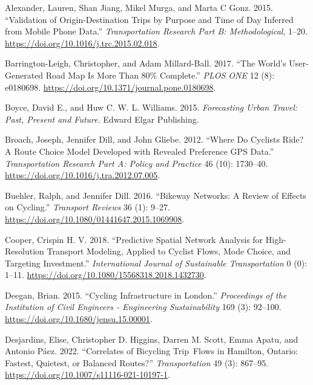 \documentclass{isprs} %
\newlength{\cslhangindent}
\newlength{\cslentryspacingunit} %
\newenvironment{CSLReferences}[2] %
 {%
  \setlength{\parindent}{0pt}
  \ifodd #1
  \let\oldpar\par
  \def\par{\hangindent=\cslhangindent\oldpar}
  \fi
  \setlength{\parskip}{#2\cslentryspacingunit}
 }%
 {}
\begin{document}
\hypertarget{refs}{}
\begin{CSLReferences}{1}{0}
\leavevmode{}%
Alexander, Lauren, Shan Jiang, Mikel Murga, and Marta C Gonz. 2015. {``Validation of Origin-Destination Trips by Purpose and Time of Day Inferred from Mobile Phone Data.''} \emph{Transportation Research Part B: Methodological}, 1--20. \url{https://doi.org/10.1016/j.trc.2015.02.018}.

\leavevmode{}%
Barrington-Leigh, Christopher, and Adam Millard-Ball. 2017. {``The World's User-Generated Road Map Is More Than 80\% Complete.''} \emph{PLOS ONE} 12 (8): e0180698. \url{https://doi.org/10.1371/journal.pone.0180698}.

\leavevmode{}%
Boyce, David E., and Huw C. W. L. Williams. 2015. \emph{Forecasting {Urban Travel}: {Past}, {Present} and {Future}}. {Edward Elgar Publishing}.

\leavevmode{}%
Broach, Joseph, Jennifer Dill, and John Gliebe. 2012. {``Where Do Cyclists Ride? {A} Route Choice Model Developed with Revealed Preference {GPS} Data.''} \emph{Transportation Research Part A: Policy and Practice} 46 (10): 1730--40. \url{https://doi.org/10.1016/j.tra.2012.07.005}.

\leavevmode{}%
Buehler, Ralph, and Jennifer Dill. 2016. {``Bikeway {Networks}: {A Review} of {Effects} on {Cycling}.''} \emph{Transport Reviews} 36 (1): 9--27. \url{https://doi.org/10.1080/01441647.2015.1069908}.

\leavevmode{}%
Cooper, Crispin H. V. 2018. {``Predictive Spatial Network Analysis for High-Resolution Transport Modeling, Applied to Cyclist Flows, Mode Choice, and Targeting Investment.''} \emph{International Journal of Sustainable Transportation} 0 (0): 1--11. \url{https://doi.org/10.1080/15568318.2018.1432730}.

\leavevmode{}%
Deegan, Brian. 2015. {``Cycling Infrastructure in {London}.''} \emph{Proceedings of the Institution of Civil Engineers - Engineering Sustainability} 169 (3): 92--100. \url{https://doi.org/10.1680/jensu.15.00001}.

\leavevmode{}%
Desjardins, Elise, Christopher D. Higgins, Darren M. Scott, Emma Apatu, and Antonio Páez. 2022. {``Correlates of Bicycling Trip~Flows in {Hamilton}, {Ontario}: Fastest, Quietest, or Balanced Routes?''} \emph{Transportation} 49 (3): 867--95. \url{https://doi.org/10.1007/s11116-021-10197-1}.


\end{CSLReferences}
\end{document}
